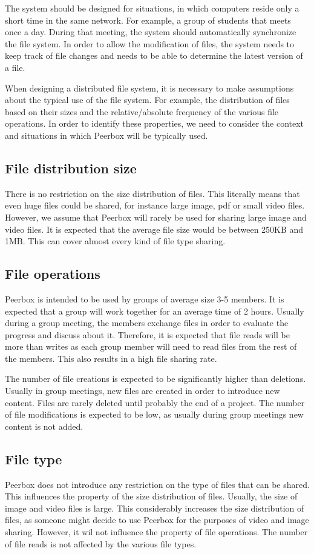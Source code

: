 The system should be designed for situations, in which computers reside only a short time in the same network. For example, a group of students that meets once a day. During that meeting, the system should automatically synchronize the file system.
In order to allow the modification of files, the system needs to keep track of file changes and needs to be able to determine the latest version of a file. 


When designing a distributed file system, it is necessary to make assumptions about the  typical use of the file system. For example, the distribution of files based on their sizes and the relative/absolute frequency of the various file operations. In order to identify these properties, we need to consider the context and situations in which Peerbox will be typically used.

\subsection{File distribution size}

There is no restriction on the size distribution of files. This literally means that even huge files could be shared, for instance large image, pdf or small video files. However, we assume that Peerbox will rarely be used for sharing large image and video files. It is expected that the average file size would be between 250KB and 1MB. This can cover almost every kind of file type sharing.

\subsection{File operations}

Peerbox is intended to be used by groups of average size 3-5 members. It is expected that a group will work together for an average time of 2 hours. Usually during a group meeting, the members exchange files in order to evaluate the progress and discuss about it. Therefore, it is expected that file reads will be more than writes as each group member will need to read files from the rest of the members. This also results in a high file sharing rate.

The number of file creations is expected to be significantly higher than deletions. Usually in group meetings, new files are created in order to introduce new content. Files are rarely deleted until probably the end of a project. The number of file modifications is expected to be low, as usually during group meetings new content is not added.

\subsection{File type}

Peerbox does not introduce any restriction on the type of files that can be shared. This influences the property of the size distribution of files. Usually, the size of image and video files is large. This considerably increases the size distribution of files, as someone might decide to use Peerbox for the purposes of video and image sharing. However, it wil not influence the property of file operations. The number of file reads is not affected by the various file types.